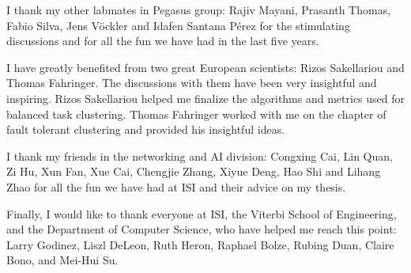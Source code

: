I thank my other labmates in Pegasus group: Rajiv Mayani, Prasanth Thomas, Fabio Silva, Jens V\"{o}ckler and Idafen Santana P\'{e}rez for the stimulating discussions and for all the fun we have had in the last five years. 

I have greatly benefited from two great European scientists: Rizos Sakellariou and Thomas Fahringer. The discussions with them have been very insightful and inspiring. Rizos Sakellariou helped me finalize the algorithms and metrics used for balanced task clustering. Thomas Fahringer worked with me on the chapter of fault tolerant clustering and provided his insightful ideas. 

I thank my friends in the networking and AI division: Congxing Cai, Lin Quan, Zi Hu, Xun Fan, Xue Cai, Chengjie Zhang, Xiyue Deng, Hao Shi and Lihang Zhao for all the fun we have had at ISI and their advice on my thesis. 

Finally, I would like to thank everyone at ISI, the Viterbi School of Engineering, and the Department of Computer Science, who have helped me reach this point: Larry Godinez, Liszl DeLeon, Ruth Heron, Raphael Bolze, Rubing Duan, Claire Bono, and Mei-Hui Su. 

